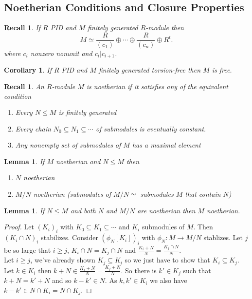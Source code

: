 \documentclass[a4paper,12pt]{article}
\newtheorem{lem}[thm]{Lemma}
\newtheorem{cor}[thm]{Corollary}
\newtheorem{rec}[thm]{Recall}
\begin{document}
\subsection{Noetherian Conditions and Closure Properties}
\begin{rec}
    If $R$ PID and $M$ finitely generated $R$-module then 
    \[
    M \simeq \frac{R}{(c_1)}\oplus \cdots \oplus \frac{R}{(c_n)}\oplus R^t
    .\]
    where $c_i$ nonzero nonunit and $c_i | c_{i+1}$.  
\end{rec}
\begin{cor}
    If $R$ PID and $M$ finitely generated torsion-free then $M$ is free. 
\end{cor}
\begin{rec}
    An $R$-module $M$ is noetherian if it satisfies any of the equivalent condition 
    \begin{enumerate}
        \item Every $N\leq M$ is finitely generated 
        \item Every chain $N_0\subseteq N_1\subseteq \cdots$ of submodules is eventually constant. 
        \item Any nonempty set of submodules of $M$ has a maximal element  
    \end{enumerate}
\end{rec}
\begin{lem}
    If $M$ noetherian and $N\leq M$ then 
    \begin{enumerate}
        \item $N$ noetherian
        \item $M/N$ noetherian (submodules of $M/N\simeq$ submodules $M$ that contain $N$) 
    \end{enumerate}
\end{lem}
\begin{lem}
    If $N\leq M$ and both $N$ and $M/N$ are noetherian then $M$ noetherian. 
\end{lem}
\begin{proof}
    Let $(K_i)_i$ with $K_0\subseteq K_1\subseteq \cdots$ and $K_i$ submodules of $M$. Then $(K_i\cap N)_i$ stabilizes. Consider $(\phi_N[K_i])_i$ with $\phi_N:M\to M/N$ stablizes. Let $j$ be so large that $i\geq j$, $K_i\cap N=K_j \cap N$ and $\frac{K_i+N}{N}=\frac{K_j\cap N}{N}$.  \\
    Let $i\geq j$, we've already shown $K_j\subseteq K_i$ so we just have to show that $K_i \subseteq K_j$. Let $k\in K_i$ then $k+N\in \frac{K_i+N}{N}=\frac{K_j+N}{N}$. So there is $k'\in K_j$ such that $k+N=k'+N$ and so $k-k'\in N$. As $k,k'\in K_i$ we also have $k-k'\in N\cap K_i=N\cap K_j$.  
\end{proof}
\end{document}
